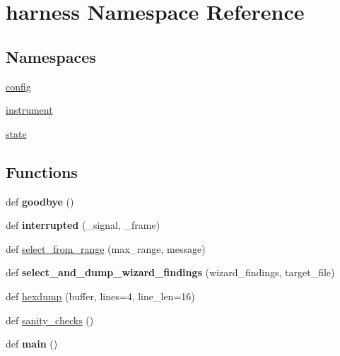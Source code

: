 \hypertarget{namespaceharness}{}\section{harness Namespace Reference}
\label{namespaceharness}
\subsection*{Namespaces}
\begin{DoxyCompactItemize}
\item 
 \mbox{\hyperlink{namespaceharness_1_1config}{config}}
\item 
 \mbox{\hyperlink{namespaceharness_1_1instrument}{instrument}}
\item 
 \mbox{\hyperlink{namespaceharness_1_1state}{state}}
\end{DoxyCompactItemize}
\subsection*{Functions}
\begin{DoxyCompactItemize}
\item 
\mbox{\label{namespaceharness_a4669cc1b82dee008260878cf36b48416}} 
def {\bfseries goodbye} ()
\item 
\mbox{\label{namespaceharness_a4b3aa6951197c5e6e965106ebdd26619}} 
def {\bfseries interrupted} (\+\_\+signal, \+\_\+frame)
\item 
def \mbox{\hyperlink{namespaceharness_a6fcf7f713a4ca2f9d9bf57bc843293e0}{select\+\_\+from\+\_\+range}} (max\+\_\+range, message)
\item 
\mbox{\label{namespaceharness_adc9713f3a6fd264d91ead482cc9e100e}} 
def {\bfseries select\+\_\+and\+\_\+dump\+\_\+wizard\+\_\+findings} (wizard\+\_\+findings, target\+\_\+file)
\item 
def \mbox{\hyperlink{namespaceharness_a2726adb0b8b48d41458ac8f34d4f17ae}{hexdump}} (buffer, lines=4, line\+\_\+len=16)
\item 
def \mbox{\hyperlink{namespaceharness_a00d01b26188a03cc58f7d4c96e92ea11}{sanity\+\_\+checks}} ()
\item 
\mbox{\label{namespaceharness_a38f488ff979de5178ac79f65e07b5d9c}} 
def {\bfseries main} ()
\end{DoxyCompactItemize}


